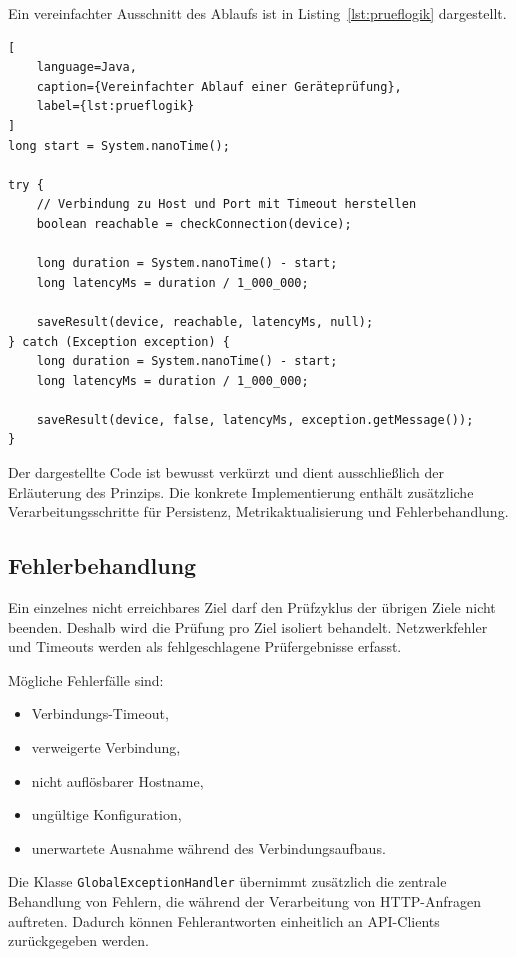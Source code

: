 Ein vereinfachter Ausschnitt des Ablaufs ist in Listing~\ref{lst:prueflogik} dargestellt.

\begin{lstlisting}[
    language=Java,
    caption={Vereinfachter Ablauf einer Geräteprüfung},
    label={lst:prueflogik}
]
long start = System.nanoTime();

try {
    // Verbindung zu Host und Port mit Timeout herstellen
    boolean reachable = checkConnection(device);

    long duration = System.nanoTime() - start;
    long latencyMs = duration / 1_000_000;

    saveResult(device, reachable, latencyMs, null);
} catch (Exception exception) {
    long duration = System.nanoTime() - start;
    long latencyMs = duration / 1_000_000;

    saveResult(device, false, latencyMs, exception.getMessage());
}
\end{lstlisting}

Der dargestellte Code ist bewusst verkürzt und dient ausschließlich der Erläuterung des Prinzips. Die konkrete Implementierung enthält zusätzliche Verarbeitungsschritte für Persistenz, Metrikaktualisierung und Fehlerbehandlung.

\subsection{Fehlerbehandlung}
\label{subsec:implementierung-fehlerbehandlung}

Ein einzelnes nicht erreichbares Ziel darf den Prüfzyklus der übrigen Ziele nicht beenden. Deshalb wird die Prüfung pro Ziel isoliert behandelt. Netzwerkfehler und Timeouts werden als fehlgeschlagene Prüfergebnisse erfasst.

Mögliche Fehlerfälle sind:

\begin{itemize}
    \item Verbindungs-Timeout,
    \item verweigerte Verbindung,
    \item nicht auflösbarer Hostname,
    \item ungültige Konfiguration,
    \item unerwartete Ausnahme während des Verbindungsaufbaus.
\end{itemize}

Die Klasse \texttt{GlobalExceptionHandler} übernimmt zusätzlich die zentrale Behandlung von Fehlern, die während der Verarbeitung von HTTP-Anfragen auftreten. Dadurch können Fehlerantworten einheitlich an API-Clients zurückgegeben werden.

